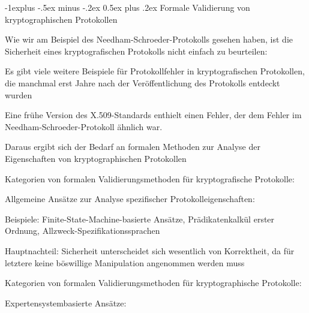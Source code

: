 \documentclass[a4paper]{article}
\makeatletter
\renewcommand{\subsection}{\@startsection{subsection}{2}{0mm}%
 {-1explus -.5ex minus -.2ex}%
 {0.5ex plus .2ex}%
 {\normalfont\normalsize\bfseries}}
\makeatother
\begin{document}
\begin{multicols}{3}
      \subsection{Formale Validierung von kryptographischen Protokollen}
      \begin{itemize*}
            \item Wie wir am Beispiel des Needham-Schroeder-Protokolls gesehen haben, ist die Sicherheit eines kryptografischen Protokolls nicht einfach zu beurteilen:
            \begin{itemize*}
                  \item Es gibt viele weitere Beispiele für Protokollfehler in kryptografischen Protokollen, die manchmal erst Jahre nach der Veröffentlichung des Protokolls entdeckt wurden
                  \begin{itemize*}
                        \item Eine frühe Version des X.509-Standards enthielt einen Fehler, der dem Fehler im Needham-Schroeder-Protokoll ähnlich war.
                  \end{itemize*}
                  \item Daraus ergibt sich der Bedarf an formalen Methoden zur Analyse der Eigenschaften von kryptographischen Protokollen
            \end{itemize*}
            \item Kategorien von formalen Validierungsmethoden für kryptografische
            Protokolle:
            \begin{itemize*}
                  \item Allgemeine Ansätze zur Analyse spezifischer Protokolleigenschaften:
                  \begin{itemize*}
                        \item Beispiele: Finite-State-Machine-basierte Ansätze, Prädikatenkalkül erster Ordnung, Allzweck-Spezifikationssprachen
                        \item Hauptnachteil: Sicherheit unterscheidet sich wesentlich von Korrektheit, da für letztere keine böswillige Manipulation angenommen werden muss
                  \end{itemize*}
            \end{itemize*}
            \item Kategorien von formalen Validierungsmethoden für kryptographische Protokolle:
            \begin{itemize*}
                  \item Expertensystembasierte Ansätze:

\end{itemize*}
\end{itemize*}
\end{multicols}
\end{document}
